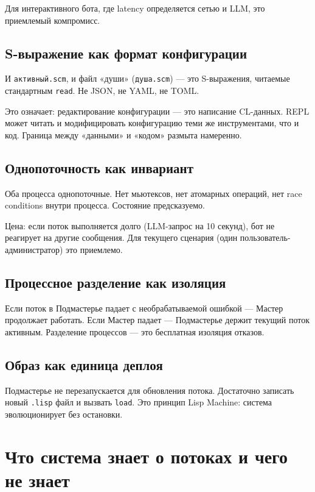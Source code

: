 \documentclass[11pt,a4paper]{article}
\begin{document}
Для интерактивного бота, где latency определяется сетью и LLM, это приемлемый компромисс.

\subsection{S-выражение как формат конфигурации}

И \texttt{активный.scm}, и файл «души» (\texttt{душа.scm}) — это S-выражения, читаемые стандартным \texttt{read}. Не JSON, не YAML, не TOML.

Это означает: редактирование конфигурации — это написание CL-данных. REPL может читать и модифицировать конфигурацию теми же инструментами, что и код. Граница между «данными» и «кодом» размыта намеренно.

\subsection{Однопоточность как инвариант}

Оба процесса однопоточные. Нет мьютексов, нет атомарных операций, нет race conditions внутри процесса. Состояние предсказуемо.

Цена: если поток выполняется долго (LLM-запрос на 10 секунд), бот не реагирует на другие сообщения. Для текущего сценария (один пользователь-администратор) это приемлемо.

\subsection{Процессное разделение как изоляция}

Если поток в Подмастерье падает с необрабатываемой ошибкой — Мастер продолжает работать. Если Мастер падает — Подмастерье держит текущий поток активным. Разделение процессов — это бесплатная изоляция отказов.

\subsection{Образ как единица деплоя}

Подмастерье не перезапускается для обновления потока. Достаточно записать новый \texttt{.lisp} файл и вызвать \texttt{load}. Это принцип Lisp Machine: система эволюционирует без остановки.

\section{Что система знает о потоках и чего не знает}
\end{document}
